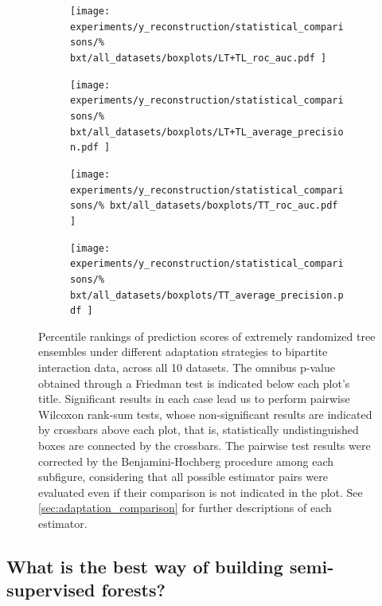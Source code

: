 \begin{figure}[tbh]
    \centering
    \begin{subfigure}{0.49\textwidth}
        \texttt{[image: 
            experiments/y\_reconstruction/statistical\_comparisons/\%
            bxt/all\_datasets/boxplots/LT+TL\_roc\_auc.pdf
        ]}
    \end{subfigure}
    \begin{subfigure}{0.49\textwidth}
        \texttt{[image: 
            experiments/y\_reconstruction/statistical\_comparisons/\%
            bxt/all\_datasets/boxplots/LT+TL\_average\_precision.pdf
        ]}
    \end{subfigure}

    \begin{subfigure}{0.49\textwidth}
        \texttt{[image: 
            experiments/y\_reconstruction/statistical\_comparisons/\%
            bxt/all\_datasets/boxplots/TT\_roc\_auc.pdf
        ]}
    \end{subfigure}
    \begin{subfigure}{0.49\textwidth}
        \texttt{[image: 
            experiments/y\_reconstruction/statistical\_comparisons/\%
            bxt/all\_datasets/boxplots/TT\_average\_precision.pdf
        ]}
    \end{subfigure}
    \caption{
        Percentile rankings of prediction scores of extremely randomized tree ensembles under different adaptation strategies to bipartite interaction data, across all 10 datasets.
        The omnibus p-value obtained through a Friedman test is indicated below each plot's title. Significant results in each case lead us to perform pairwise Wilcoxon rank-sum tests, whose non-significant results are indicated by crossbars above each plot, that is, statistically undistinguished boxes are connected by the crossbars. The pairwise test results were corrected by the Benjamini-Hochberg procedure among each subfigure, considering that all possible estimator pairs were evaluated even if their comparison is not indicated in the plot. See \autoref{sec:adaptation_comparison} for further descriptions of each estimator.
    }
    \label{fig:bxt_y_reconstruction}
\end{figure}



\subsection{What is the best way of building semi-supervised forests?}
\label{sec:ss_comparison}

